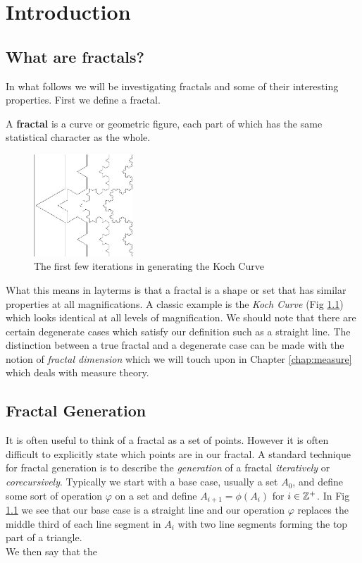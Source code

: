 \chapter{Introduction}
\label{chap:intro}
\section{What are fractals?}
In what follows we will be investigating fractals and some of their interesting
properties. First we define a fractal.

\begin{dfn}
  A {\bf fractal} is a curve or geometric figure, each part of
  which has the same statistical character as the whole.
\end{dfn}

\begin{figure}
  \centering
  \includegraphics[width=0.33\textwidth]{img/bk_introkochgen}
  \caption{The first few iterations in generating the Koch Curve}
  \label{fig:intro koch}
\end{figure}
What this means in layterms is that a fractal is a shape or set that has
similar properties at all magnifications. A classic example is the {\em Koch
Curve} (Fig \ref{fig:intro koch}) which looks identical at all levels of
magnification. We should note that there are certain degenerate cases which
satisfy our definition such as a straight line. The distinction between a
true fractal and a degenerate case can be made with the notion of {\em fractal
dimension} which we will touch upon in Chapter \ref{chap:measure} which deals
with measure theory.\\

\section{Fractal Generation}
\label{sec:fractal generation}
It is often useful to think of a fractal as a set of points. However it is
often difficult to explicitly state which points are in our fractal. A standard
technique for fractal generation is to describe the {\em generation} of a 
fractal {\em iteratively} or {\em corecursively}. Typically we start with a
base case, usually a set \(A_0\), and define some sort of operation \(\varphi\)
on a set and define \(A_{i+1} = \phi(A_i)\) for \(i \in \mathbb Z^+\). In
Fig \ref{fig:intro koch} we see that our base case is a straight line and our
operation \(\varphi\) replaces the middle third of each line segment in \(A_i\)
with two line segments forming the top part of a triangle.\\

We then say that the 

